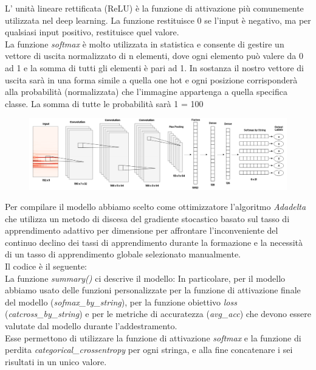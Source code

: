 L' unità lineare rettificata (ReLU) è la funzione di attivazione più comunemente utilizzata nel deep learning. La funzione restituisce 0 se l'input è negativo, ma per qualsiasi input positivo, restituisce quel valore.\\
La funzione \textit{softmax} è molto utilizzata in statistica e consente di gestire un vettore di uscita normalizzato di n elementi, dove ogni elemento può valere da 0 ad 1 e la somma di tutti gli elementi è pari ad 1. In sostanza il nostro vettore di uscita sarà in una forma simile a quella one hot e ogni posizione corrisponderà alla probabilità (normalizzata) che l’immagine appartenga a quella specifica classe. La somma di tutte le probabilità sarà 1 = 100%
\begin{figure}[H]
	\centering
	\includegraphics[scale=1.4]{./images/model.png}
\end{figure}
Per compilare il modello abbiamo scelto come ottimizzatore l'algoritmo \textit{Adadelta} che utilizza un metodo di discesa del gradiente stocastico basato sul tasso di apprendimento adattivo per dimensione per affrontare l'inconveniente del continuo declino dei tassi di apprendimento durante la formazione e la necessità di un tasso di apprendimento globale selezionato manualmente.\\
Il codice è il seguente:\\
\newline
\vspace*{2ex}
\vspace*{2ex}
La funzione \textit{summary()} ci descrive il modello:
\vspace*{2ex}
\vspace*{2ex}
In particolare, per il modello abbiamo usato delle funzioni personalizzate per la funzione di attivazione finale del modello (\textit{sofmax\_by\_string}), per la funzione obiettivo \textit{loss} (\textit{catcross\_by\_string}) e per le metriche di accuratezza (\textit{avg\_acc}) che devono essere valutate dal modello durante l'addestramento.\\
Esse permettono di utilizzare la funzione di attivazione \textit{softmax} e la funzione di perdita \textit{categorical_crossentropy} per ogni stringa, e alla fine concatenare i sei risultati in un unico valore.\\
